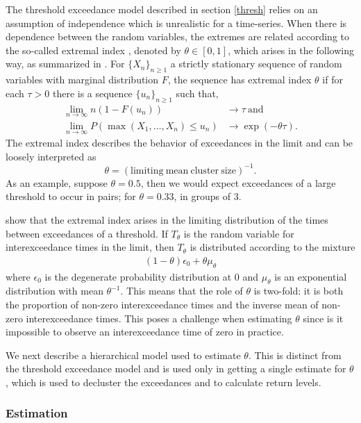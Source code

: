 The threshold exceedance model described in section \ref{thresh} relies on an assumption of independence which is unrealistic for a time-series. When there is dependence between the random variables, the extremes are related according to the so-called extremal index \citep{leadbetter1983extremes}, denoted by $\theta\in[0,1]$, which arises in the following way, as summarized in \cite{ferro2003inference}. For $\{X_n\}_{n\geq 1}$ a strictly stationary sequence of random variables with marginal distribution $F$, the sequence has extremal index $\theta$ if for each $\tau>0$ there is a sequence $\{u_n\}_{n\geq 1}$ such that,
\begin{align}
\lim_{n\rightarrow\infty} n(1-F(u_n)) &\rightarrow \tau \mathrm{~and~} \nonumber \\
\lim_{n\rightarrow\infty} P(\max(X_1,\ldots,X_n)\leq u_n) &\rightarrow \exp(-\theta\tau). \nonumber
\end{align}
The extremal index describes the behavior of exceedances in the limit and can be loosely interpreted as
\[ \theta = (\mathrm{limiting~mean~cluster~size})^{-1}. \]
As an example, suppose $\theta=0.5$, then we would expect exceedances of a large threshold to occur in pairs; for $\theta=0.33$, in groups of 3.

\cite{ferro2003inference} show that the extremal index arises in the limiting distribution of the times between exceedances of a threshold. If $T_\theta$ is the random variable for interexceedance times in the limit, then $T_\theta$ is distributed according to the mixture
\begin{align}
(1-\theta)\epsilon_0 + \theta \mu_\theta
\end{align}
where $\epsilon_0$ is the degenerate probability distribution at $0$ and $\mu_\theta$ is an exponential distribution with mean $\theta^{-1}$. This means that the role of $\theta$ is two-fold: it is both the proportion of non-zero interexceedance times and the inverse mean of non-zero interexceedance times. This poses a challenge when estimating $\theta$ since is it impossible to observe an interexceedance time of zero in practice.

We next describe a hierarchical model used to estimate $\theta$. This is distinct from the threshold exceedance model and is used only in getting a single estimate for $\theta$, which is used to decluster the exceedances and to calculate return levels.

\subsubsection{Estimation}


